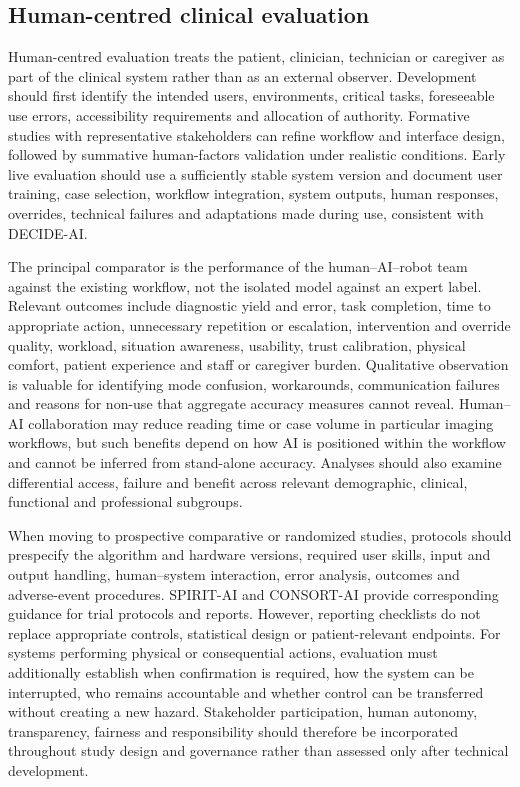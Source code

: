 \documentclass[12pt,a4paper]{article}
\begin{document}
\subsection{Human-centred clinical evaluation}
\label{subsec:human_centred_clinical_evaluation}
Human-centred evaluation treats the patient, clinician, technician or caregiver as part of the clinical system rather than as an external observer. Development should first identify the intended users, environments, critical tasks, foreseeable use errors, accessibility requirements and allocation of authority. Formative studies with representative stakeholders can refine workflow and interface design, followed by summative human-factors validation under realistic conditions. Early live evaluation should use a sufficiently stable system version and document user training, case selection, workflow integration, system outputs, human responses, overrides, technical failures and adaptations made during use, consistent with DECIDE-AI.

The principal comparator is the performance of the human--AI--robot team against the existing workflow, not the isolated model against an expert label. Relevant outcomes include diagnostic yield and error, task completion, time to appropriate action, unnecessary repetition or escalation, intervention and override quality, workload, situation awareness, usability, trust calibration, physical comfort, patient experience and staff or caregiver burden. Qualitative observation is valuable for identifying mode confusion, workarounds, communication failures and reasons for non-use that aggregate accuracy measures cannot reveal. Human--AI collaboration may reduce reading time or case volume in particular imaging workflows, but such benefits depend on how AI is positioned within the workflow and cannot be inferred from stand-alone accuracy. Analyses should also examine differential access, failure and benefit across relevant demographic, clinical, functional and professional subgroups.

When moving to prospective comparative or randomized studies, protocols should prespecify the algorithm and hardware versions, required user skills, input and output handling, human--system interaction, error analysis, outcomes and adverse-event procedures. SPIRIT-AI and CONSORT-AI provide corresponding guidance for trial protocols and reports. However, reporting checklists do not replace appropriate controls, statistical design or patient-relevant endpoints. For systems performing physical or consequential actions, evaluation must additionally establish when confirmation is required, how the system can be interrupted, who remains accountable and whether control can be transferred without creating a new hazard. Stakeholder participation, human autonomy, transparency, fairness and responsibility should therefore be incorporated throughout study design and governance rather than assessed only after technical development.
\end{document}

